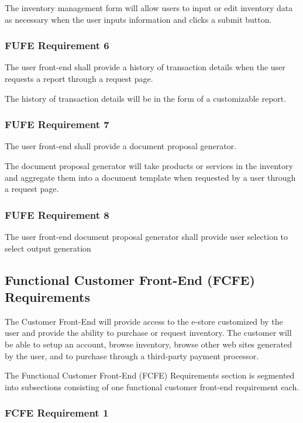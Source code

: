 \documentclass{article}
\begin{document}
The inventory management form will allow users to input or edit inventory data
as necessary when the user inputs information and clicks a submit button.

\subsubsection{FUFE Requirement 6}
\label{func-user-front-end-6}

The user front-end shall provide a history of transaction details when the user
requests a report through a request page.

The history of transaction details will be in the form of a customizable report.

\subsubsection{FUFE Requirement 7}
\label{func-user-front-end-7}

The user front-end shall provide a document proposal generator.

The document proposal generator will take products or services in the inventory
and aggregate them into a document template when requested by a user through a
request page.

\subsubsection{FUFE Requirement 8}
\label{func-user-front-end-8}

The user front-end document proposal generator shall provide user selection to
select output generation

\pagebreak
\subsection{Functional Customer Front-End (FCFE) Requirements}

The Customer Front-End will provide access to the e-store customized by the user
and provide the ability to purchase or request inventory.  The customer will
be able to setup an account, browse inventory, browse other web sites generated
by the user, and to purchase through a third-party payment processor.

The Functional Customer Front-End (FCFE) Requirements section is segmented into
subsections consisting of one functional customer front-end requirement each.

\subsubsection{FCFE Requirement 1}
\label{func-cust-front-end-1}
\end{document}
